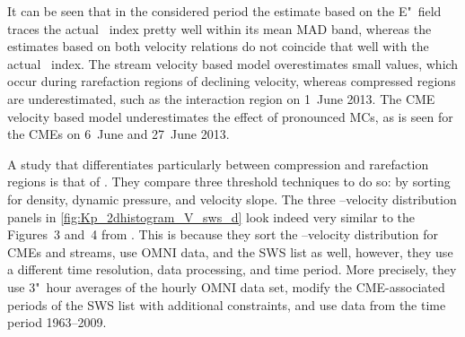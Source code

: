 It can be seen that in the considered period the \Kp{} estimate based on the E"~field traces the actual \Kp~index pretty well within its mean MAD band, whereas the \Kp{} estimates based on both velocity relations do not coincide that well with the actual \Kp~index. The stream velocity based model overestimates small \Kp{} values, which occur during rarefaction regions of declining velocity, whereas compressed regions are underestimated, such as the interaction region on 1~June 2013. The CME velocity based model underestimates the effect of pronounced MCs, as is seen for the CMEs on 6~June and 27~June 2013.

A study that differentiates particularly between compression and rarefaction regions is that of \citet{Elliott2013}. They compare three threshold techniques to do so: by sorting for density, dynamic pressure, and velocity slope. The three \Kp--velocity distribution panels in \autoref{fig:Kp_2dhistogram_V_sws_d} look indeed very similar to the Figures~3 and~4 from \citet{Elliott2013}. This is because they sort the \Kp{}--velocity distribution for CMEs and streams, use OMNI data, and the SWS list as well, however, they use a different time resolution, data processing, and time period. More precisely, they use 3"~hour averages of the hourly OMNI data set, modify the CME-associated periods of the SWS list with additional constraints, and use data from the time period 1963--2009.

\pagebreak

